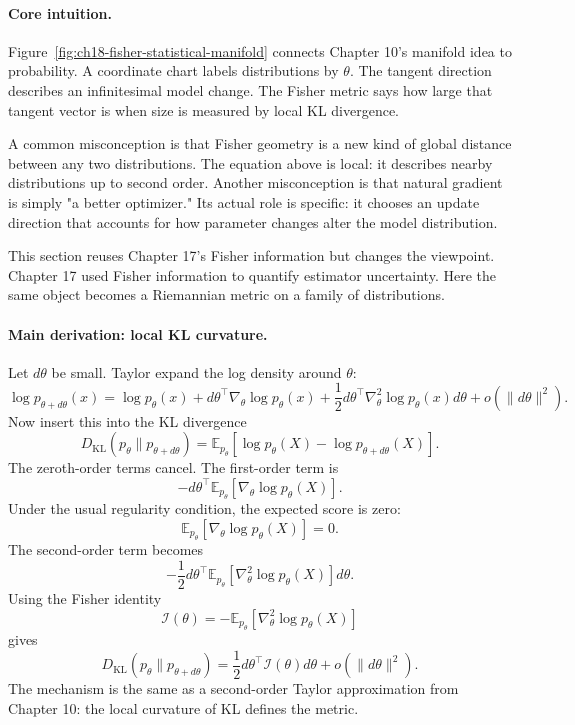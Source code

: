 \paragraph{Core intuition.}
Figure~\ref{fig:ch18-fisher-statistical-manifold} connects Chapter 10's manifold idea to probability. A coordinate chart labels distributions by \(\theta\). The tangent direction describes an infinitesimal model change. The Fisher metric says how large that tangent vector is when size is measured by local KL divergence.

A common misconception is that Fisher geometry is a new kind of global distance between any two distributions. The equation above is local: it describes nearby distributions up to second order. Another misconception is that natural gradient is simply "a better optimizer." Its actual role is specific: it chooses an update direction that accounts for how parameter changes alter the model distribution.

This section reuses Chapter 17's Fisher information but changes the viewpoint. Chapter 17 used Fisher information to quantify estimator uncertainty. Here the same object becomes a Riemannian metric on a family of distributions.

\paragraph{Main derivation: local KL curvature.}
Let \(d\theta\) be small. Taylor expand the log density around \(\theta\):
\[
\log p_{\theta+d\theta}(x)
=\log p_\theta(x)
+d\theta^\top \nabla_\theta\log p_\theta(x)
+\frac12 d\theta^\top \nabla_\theta^2\log p_\theta(x)d\theta
+o(\|d\theta\|^2).
\]
Now insert this into the KL divergence
\[
D_{\mathrm{KL}}(p_\theta\|p_{\theta+d\theta})
=\mathbb E_{p_\theta}\left[
\log p_\theta(X)-\log p_{\theta+d\theta}(X)
\right].
\]
The zeroth-order terms cancel. The first-order term is
\[
-d\theta^\top\mathbb E_{p_\theta}[\nabla_\theta\log p_\theta(X)].
\]
Under the usual regularity condition, the expected score is zero:
\[
\mathbb E_{p_\theta}[\nabla_\theta\log p_\theta(X)]=0.
\]
The second-order term becomes
\[
-\frac12 d\theta^\top
\mathbb E_{p_\theta}[\nabla_\theta^2\log p_\theta(X)]
d\theta.
\]
Using the Fisher identity
\[
\mathcal I(\theta)
=-\mathbb E_{p_\theta}[\nabla_\theta^2\log p_\theta(X)]
\]
gives
\[
D_{\mathrm{KL}}(p_\theta\|p_{\theta+d\theta})
=\frac12 d\theta^\top\mathcal I(\theta)d\theta
+o(\|d\theta\|^2).
\]
The mechanism is the same as a second-order Taylor approximation from Chapter 10: the local curvature of KL defines the metric.

